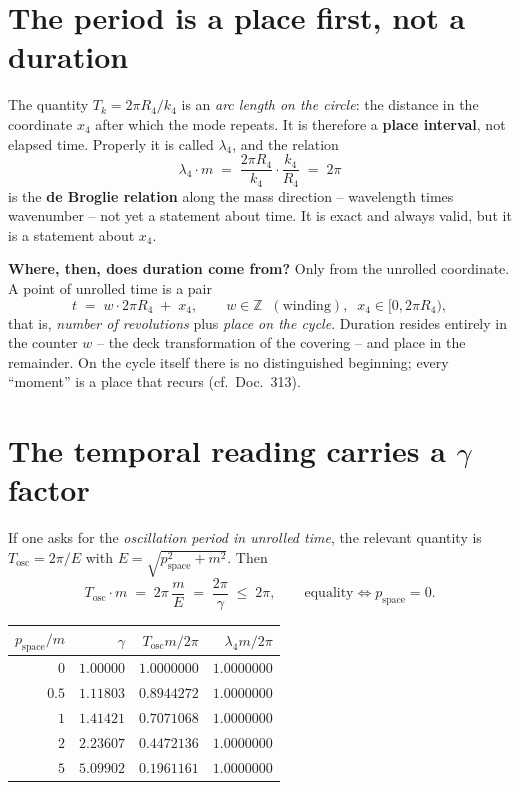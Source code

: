 \section{The period is a place first, not a duration}

The quantity $T_k = 2\pi R_4/k_4$ is an \emph{arc length on the
circle}: the distance in the coordinate $x_4$ after which the mode
repeats. It is therefore a \textbf{place interval}, not elapsed
time. Properly it is called $\lambda_4$, and the relation
\begin{equation}
  \lambda_4 \cdot m \;=\; \frac{2\pi R_4}{k_4}\cdot\frac{k_4}{R_4}
  \;=\; 2\pi
\end{equation}
is the \textbf{de Broglie relation} along the mass direction --
wavelength times wavenumber -- not yet a statement about time. It
is exact and always valid, but it is a statement about $x_4$.

\textbf{Where, then, does duration come from?} Only from the
unrolled coordinate. A point of unrolled time is a pair
\begin{equation}
  t \;=\; w\cdot 2\pi R_4 \;+\; x_4,
  \qquad w \in \mathbb{Z} \;\;(\text{winding}),\;\;
  x_4 \in [0, 2\pi R_4),
\end{equation}
that is, \emph{number of revolutions} plus \emph{place on the
cycle}. Duration resides entirely in the counter $w$ -- the deck
transformation of the covering -- and place in the remainder. On
the cycle itself there is no distinguished beginning; every
\enquote{moment} is a place that recurs (cf.\ Doc.~313).

\section{The temporal reading carries a \texorpdfstring{$\gamma$}{gamma} factor}

If one asks for the \emph{oscillation period in unrolled time},
the relevant quantity is $T_\text{osc} = 2\pi/E$ with
$E = \sqrt{p_\text{space}^2 + m^2}$. Then
\begin{equation}
  T_\text{osc}\cdot m \;=\; 2\pi\,\frac{m}{E}
  \;=\; \frac{2\pi}{\gamma}
  \;\le\; 2\pi,
  \qquad\text{equality} \iff p_\text{space} = 0 .
\end{equation}

\begin{center}
\begin{tabular}{rrrr}
\toprule
$p_\text{space}/m$ & $\gamma$ & $T_\text{osc}m/2\pi$ &
  $\lambda_4 m/2\pi$ \\
\midrule
$0$   & $1.00000$ & $1.0000000$ & $1.0000000$ \\
$0.5$ & $1.11803$ & $0.8944272$ & $1.0000000$ \\
$1$   & $1.41421$ & $0.7071068$ & $1.0000000$ \\
$2$   & $2.23607$ & $0.4472136$ & $1.0000000$ \\
$5$   & $5.09902$ & $0.1961161$ & $1.0000000$ \\
\bottomrule
\end{tabular}
\end{center}

